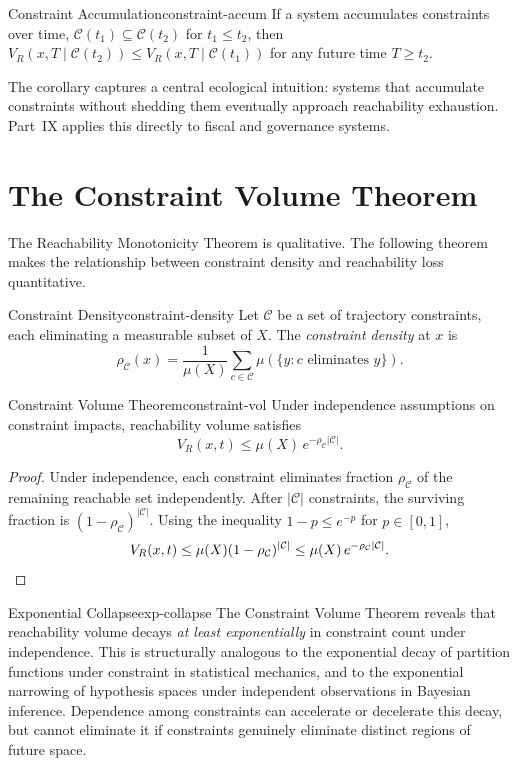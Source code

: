 \documentclass[12pt,twoside,openright]{book}
\begin{document}
\begin{corollary}{Constraint Accumulation}{constraint-accum}
  If a system accumulates constraints over time,
  $\mathcal{C}(t_1)\subseteq\mathcal{C}(t_2)$ for
  $t_1\le t_2$, then
  $V_R(x,T\mid\mathcal{C}(t_2)) \le V_R(x,T\mid\mathcal{C}(t_1))$
  for any future time $T\ge t_2$.
\end{corollary}

The corollary captures a central ecological intuition:
systems that accumulate constraints without shedding them
eventually approach reachability exhaustion. Part~IX
applies this directly to fiscal and governance systems.

\section{The Constraint Volume Theorem}
\label{sec:ch13-constraint-vol}

The Reachability Monotonicity Theorem is qualitative. The
following theorem makes the relationship between constraint
density and reachability loss quantitative.

\begin{definition}{Constraint Density}{constraint-density}
  Let $\mathcal{C}$ be a set of trajectory constraints, each
  eliminating a measurable subset of $X$. The
  \emph{constraint density} at $x$ is
  \[
    \rho_\mathcal{C}(x)
    = \frac{1}{\mu(X)} \sum_{c\in\mathcal{C}}
      \mu(\{y : c\text{ eliminates }y\}).
  \]
\end{definition}

\begin{theorem}{Constraint Volume Theorem}{constraint-vol}
  Under independence assumptions on constraint impacts,
  reachability volume satisfies
  \[
    V_R(x,t) \le \mu(X)\, e^{-\rho_\mathcal{C}|\mathcal{C}|}.
  \]
\end{theorem}

\begin{proof}
  Under independence, each constraint eliminates fraction
  $\rho_\mathcal{C}$ of the remaining reachable set
  independently. After $|\mathcal{C}|$ constraints, the
  surviving fraction is
  $(1-\rho_\mathcal{C})^{|\mathcal{C}|}$. Using the
  inequality $1-p\le e^{-p}$ for $p\in[0,1]$,
  \[
    V_R(x,t)
    \le \mu(X)(1-\rho_\mathcal{C})^{|\mathcal{C}|}
    \le \mu(X)\,e^{-\rho_\mathcal{C}|\mathcal{C}|}. \qedhere
  \]
\end{proof}

\begin{remark}{Exponential Collapse}{exp-collapse}
  The Constraint Volume Theorem reveals that reachability
  volume decays \emph{at least exponentially} in constraint
  count under independence. This is structurally analogous
  to the exponential decay of partition functions under
  constraint in statistical mechanics, and to the
  exponential narrowing of hypothesis spaces under
  independent observations in Bayesian inference.
  Dependence among constraints can accelerate or decelerate
  this decay, but cannot eliminate it if constraints
  genuinely eliminate distinct regions of future space.
\end{remark}
\end{document}
